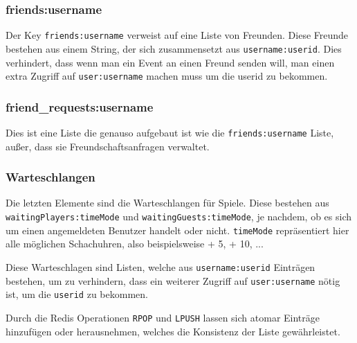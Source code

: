 \subsubsection{friends:username}
Der Key \verb|friends:username| verweist auf eine Liste von Freunden. Diese Freunde bestehen aus einem String, der sich zusammensetzt aus \verb|username:userid|. Dies verhindert, dass wenn man ein Event an einen Freund senden will, man einen extra Zugriff auf \verb|user:username| machen muss um die userid zu bekommen.

\subsubsection{friend\_requests:username}
Dies ist eine Liste die genauso aufgebaut ist wie die \verb|friends:username| Liste, außer, dass sie Freundschaftsanfragen verwaltet.

\subsubsection{Warteschlangen}
\label{sec:Warteschlange}
Die letzten Elemente sind die Warteschlangen für Spiele. Diese bestehen aus \verb|waitingPlayers:timeMode| und \verb|waitingGuests:timeMode|, je nachdem, ob es sich um einen angemeldeten Benutzer handelt oder nicht. \verb|timeMode| repräsentiert hier alle möglichen Schachuhren, also beispielsweise  + 5\grqq ,  + 10\grqq , ...

Diese Warteschlagen sind Listen, welche aus \verb|username:userid| Einträgen bestehen, um zu verhindern, dass ein weiterer Zugriff auf \verb|user:username| nötig ist, um die \verb|userid| zu bekommen. 

Durch die Redis Operationen \verb|RPOP| und \verb|LPUSH| lassen sich atomar Einträge hinzufügen oder herausnehmen, welches die Konsistenz der Liste gewährleistet.